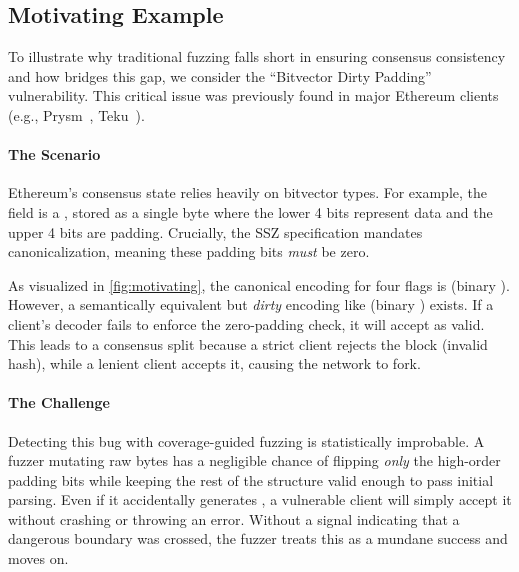 \subsection{Motivating Example}

To illustrate why traditional fuzzing falls short in ensuring consensus consistency and how \tool bridges this gap, we consider the ``Bitvector Dirty Padding'' vulnerability. This critical issue was previously found in major Ethereum clients (e.g., Prysm~\cite{prysm}, Teku~\cite{teku}).

\paragraph{The Scenario}
Ethereum's consensus state relies heavily on bitvector types. For example, the  field is a , stored as a single byte where the lower 4 bits represent data and the upper 4 bits are padding. Crucially, the SSZ specification mandates canonicalization, meaning these padding bits \emph{must} be zero.

As visualized in \autoref{fig:motivating}, the canonical encoding for four  flags is  (binary ). However, a semantically equivalent but \emph{dirty} encoding like  (binary ) exists. If a client's decoder fails to enforce the zero-padding check, it will accept  as valid. This leads to a consensus split because a strict client rejects the block (invalid hash), while a lenient client accepts it, causing the network to fork.

\paragraph{The Challenge}
Detecting this bug with coverage-guided fuzzing is statistically improbable. A fuzzer mutating raw bytes has a negligible chance of flipping \emph{only} the high-order padding bits while keeping the rest of the structure valid enough to pass initial parsing. Even if it accidentally generates , a vulnerable client will simply accept it without crashing or throwing an error. Without a signal indicating that a dangerous boundary was crossed, the fuzzer treats this as a mundane success and moves on.

